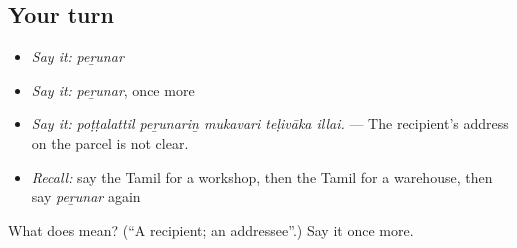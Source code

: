 \subsection*{Your turn}
\begin{itemize}
\raggedright
  \item \emph{Say it:} \emph{peṟunar}
  \item \emph{Say it:} \emph{peṟunar}, once more
  \item \emph{Say it:} \emph{poṭṭalattil peṟunariṉ mukavari teḷivāka illai.} — The recipient's address on the parcel is not clear.
  \item \emph{Recall:} say the Tamil for a workshop, then the Tamil for a warehouse, then say \emph{peṟunar} again
\end{itemize}

\begin{tcolorbox}[breakable,colback=teal!4,colframe=teal!35!black,title={Before you move on}]
What does  mean? (\textquotedblleft{}A recipient; an addressee\textquotedblright{}.) Say it once more.
\end{tcolorbox}
